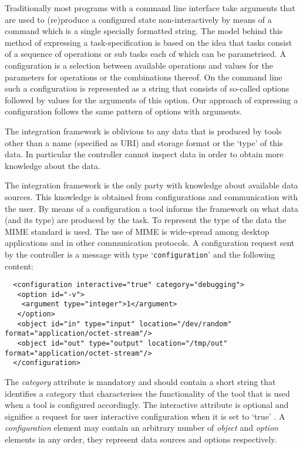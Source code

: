 \documentclass{article}
\begin{document}
   Traditionally most programs with a command line interface take arguments
   that are used to (re)produce a configured state non-interactively by means
   of a command which is a single specially formatted string. The model behind
   this method of expressing a task-specification is based on the idea that
   tasks consist of a sequence of operations or sub tasks each of which can be
   parametrised.  A configuration is a selection between available operations
   and values for the parameters for operations or the combinations thereof. On
   the command line such a configuration is represented as a string that
   consists of so-called options followed by values for the arguments of this
   option. Our approach of expressing a configuration follows the same pattern
   of options with arguments.

   The integration framework is oblivious to any data that is produced by tools
   other than a name (specified as URI) and storage format or the `type' of
   this data.  In particular the controller cannot inspect data in order to
   obtain more knowledge about the data.

   The integration framework is the only party with knowledge about available
   data sources. This knowledge is obtained from configurations and
   communication with the user. By means of a configuration a tool informs the
   framework on what data (and its type) are produced by the task. To represent
   the type of the data the MIME standard is used. The use of MIME is
   wide-spread among desktop applications and in other communication protocols.
   A configuration request sent by the controller is a message with type
   `\texttt{configuration}' and the following content:

   \small \begin{verbatim}
  <configuration interactive="true" category="debugging">
   <option id="-v">
    <argument type="integer">1</argument>
   </option>
   <object id="in" type="input" location="/dev/random" format="application/octet-stream"/>
   <object id="out" type="output" location="/tmp/out" format="application/octet-stream"/>
  </configuration>\end{verbatim}
  \normalsize

   \noindent The \textit{category} attribute is mandatory and should contain a
   short string that identifies a category that characterises the functionality
   of the tool that is used when a tool is configured accordingly.  The
   interactive attribute is optional and signifies a request for user
   interactive configuration when it is set to `true' . A
   \textit{configuration} element may contain an arbitrary number of
   \textit{object} and \textit{option} elements in any order, they represent
   data sources and options respectively.
   
\end{document}
